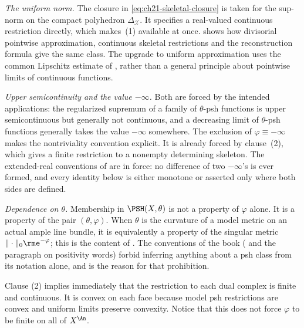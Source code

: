 \emph{The uniform norm.}  The closure in
\eqref{eq:ch21-skeletal-closure} is taken for the sup-norm on the compact
polyhedron $\Delta_{\mathcal X}$.  It specifies a real-valued continuous
restriction directly, which makes
\,(1) available at once.
 shows how divisorial pointwise approximation,
continuous skeletal restrictions and the reconstruction formula give the
same class.  The upgrade to uniform approximation uses the common
Lipschitz estimate of , rather than
a general principle about pointwise limits of continuous functions.

\emph{Upper semicontinuity and the value $-\infty$.}  Both are forced by
the intended applications: the regularized supremum of a family of
$\theta$-psh functions is upper semicontinuous but generally not
continuous, and a decreasing limit of $\theta$-psh functions generally
takes the value $-\infty$ somewhere.  The exclusion of
$\varphi\equiv-\infty$ makes the nontriviality convention explicit.
It is already forced by clause~(2), which gives a finite restriction to a
nonempty determining skeleton.  The extended-real conventions of
 are in force: no difference of two
$-\infty$'s is ever formed, and every identity below is either
monotone or asserted only where both sides are defined.

\emph{Dependence on $\theta$.}  Membership in $\PSH(X,\theta)$ is not a
property of $\varphi$ alone.  It is a property of the pair
$(\theta,\varphi)$.  When $\theta$ is the curvature of a model metric
on an actual ample line bundle, it is equivalently a property of the
singular metric $\|\cdot\|_0\rme^{-\varphi}$; this is the content of
.  The conventions of the book
( and the paragraph on positivity words)
forbid inferring anything about a psh class from its notation alone, and
 is the reason for that prohibition.

Clause (2) implies immediately that the restriction to each dual complex is
finite and continuous.  It is convex on each face because model psh
restrictions are convex and uniform limits preserve convexity.  Notice that
this does not force $\varphi$ to be finite on all of $X^{\An}$.

